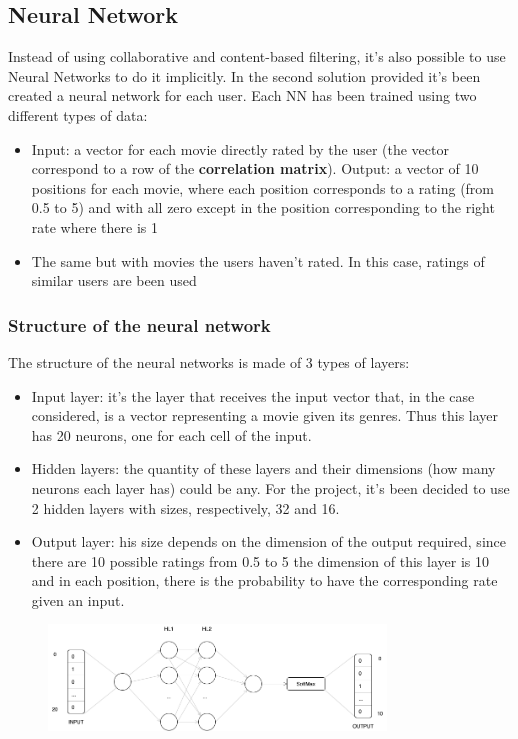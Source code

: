 \documentclass{article}
\begin{document}
\subsection{Neural Network}
Instead of using collaborative and content-based filtering, it's also possible to use Neural Networks to do it implicitly. In the second solution provided it's been created a neural network for each user. Each NN has been trained using two different types of data:

\begin{itemize}
    \item Input: a vector for each movie directly rated by the user (the vector correspond to a row of the \textbf{correlation matrix}).\newline
    Output: a vector of 10 positions for each movie, where each position corresponds to a rating (from 0.5 to 5) and with all zero except in the position corresponding to the right rate where there is 1
    \item The same but with movies the users haven't rated. In this case, ratings of similar users are been used
\end{itemize}

\subsubsection{Structure of the neural network}

The structure of the neural networks is made of 3 types of layers:
\begin{itemize}
    \item Input layer: it's the layer that receives the input vector that, in the case considered, is a vector representing a movie given its genres. Thus this layer has 20 neurons, one for each cell of the input.
    \item Hidden layers: the quantity of these layers and their dimensions (how many neurons each layer has) could be any. For the project, it's been decided to use 2 hidden layers with sizes, respectively, 32 and 16.
    \item Output layer: his size depends on the dimension of the output required, since there are 10 possible ratings from 0.5 to 5 the dimension of this layer is 10 and in each position, there is the probability to have the corresponding rate given an input.
\end{itemize}
\begin{figure}[ht]
      \begin{center}
            \includegraphics[width=0.8\textwidth]{images/ANN_img.png}
      \end{center}
\end{figure}
\end{document}
